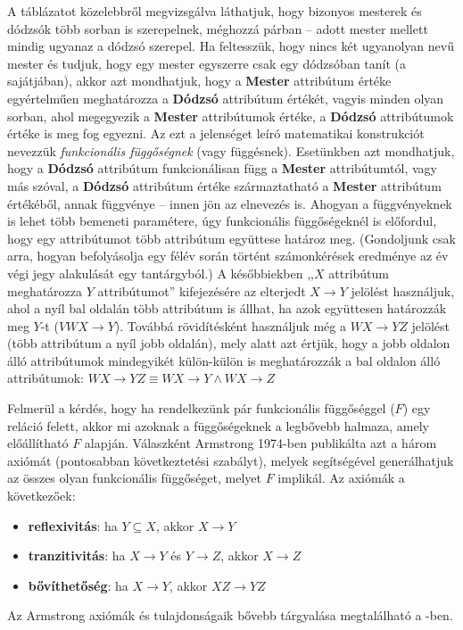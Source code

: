 %
A táblázatot közelebbről megvizsgálva láthatjuk, hogy bizonyos mesterek és dódzsók több sorban is szerepelnek, méghozzá párban -- adott mester mellett mindig ugyanaz a dódzsó szerepel.
Ha feltesszük, hogy nincs két ugyanolyan nevű mester és tudjuk, hogy egy mester egyszerre csak egy dódzsóban tanít (a sajátjában), akkor azt mondhatjuk, hogy a \textbf{Mester} attribútum értéke egyértelműen meghatározza a \textbf{Dódzsó} attribútum értékét, vagyis minden olyan sorban, ahol megegyezik a \textbf{Mester} attribútumok értéke, a \textbf{Dódzsó} attribútumok értéke is meg fog egyezni.
Az ezt a jelenséget leíró matematikai konstrukciót nevezzük \emph{funkcionális függőségnek} (vagy függésnek)\cite{Gajdos06}.
Esetünkben azt mondhatjuk, hogy a \textbf{Dódzsó} attribútum funkcionálisan függ a \textbf{Mester} attribútumtól, vagy más szóval, a \textbf{Dódzsó} attribútum értéke származtatható a \textbf{Mester} attribútum értékéből, annak függvénye -- innen jön az elnevezés is.
Ahogyan a függvényeknek is lehet több bemeneti paramétere, úgy funkcionális függőségeknél is előfordul, hogy egy attribútumot több attribútum együttese határoz meg. (Gondoljunk csak arra, hogyan befolyásolja egy félév során történt számonkérések eredménye az év végi jegy alakulását egy tantárgyból.)
A későbbiekben ,,$X$ attribútum meghatározza $Y$ attribútumot'' kifejezésére az elterjedt $X \rightarrow Y$ jelölést használjuk, ahol a nyíl bal oldalán több attribútum is állhat, ha azok együttesen határozzák meg $Y$-t ($VWX \rightarrow Y$). Továbbá rövidítésként használjuk még a $WX \rightarrow YZ$ jelölést (több attribútum a nyíl jobb oldalán), mely alatt azt értjük, hogy a jobb oldalon álló attribútumok mindegyikét külön-külön is meghatározzák a bal oldalon álló attribútumok: $WX \rightarrow YZ \equiv WX \rightarrow Y \wedge WX \rightarrow Z$

Felmerül a kérdés, hogy ha rendelkezünk pár funkcionális függőséggel ($F$) egy reláció felett, akkor mi azoknak a függőségeknek a legbővebb halmaza, amely előállítható $F$ alapján.
Válaszként Armstrong 1974-ben publikálta azt a három axiómát (pontosabban következtetési szabályt), melyek segítségével generálhatjuk az összes olyan funkcionális függőséget, melyet $F$ implikál.
Az axiómák a következőek:
\begin{itemize}
    \item \textbf{reflexivitás}: ha $Y \subseteq X$, akkor $X \rightarrow Y$
    \item \textbf{tranzitivitás}: ha $X \rightarrow Y$ és $Y \rightarrow Z$, akkor $X \rightarrow Z$
    \item \textbf{bővíthetőség}: ha $X \rightarrow Y$, akkor $XZ \rightarrow YZ$
\end{itemize}
Az Armstrong axiómák és tulajdonságaik bővebb tárgyalása megtalálható a \cite{Gajdos06}-ben.

